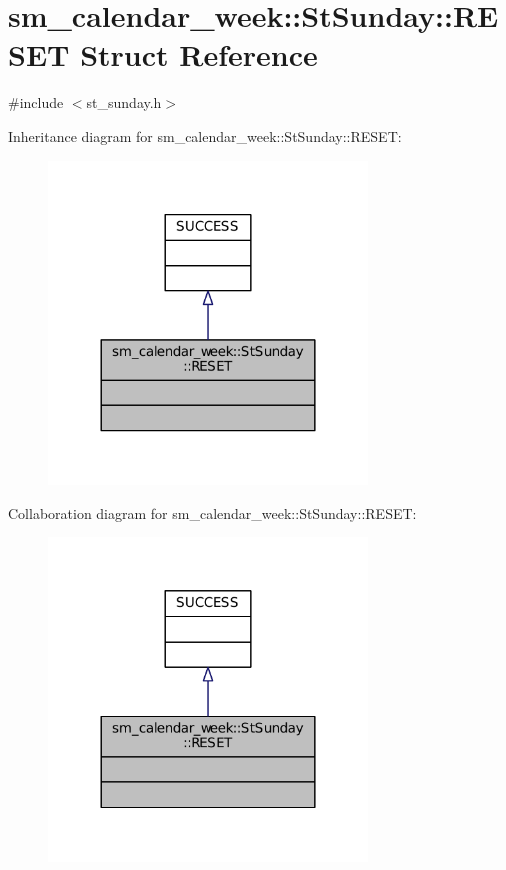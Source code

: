 \hypertarget{structsm__calendar__week_1_1StSunday_1_1RESET}{}\section{sm\+\_\+calendar\+\_\+week\+:\+:St\+Sunday\+:\+:R\+E\+S\+ET Struct Reference}
\label{structsm__calendar__week_1_1StSunday_1_1RESET}


{\ttfamily \#include $<$st\+\_\+sunday.\+h$>$}



Inheritance diagram for sm\+\_\+calendar\+\_\+week\+:\+:St\+Sunday\+:\+:R\+E\+S\+ET\+:
\nopagebreak
\begin{figure}[H]
\begin{center}
\leavevmode
\includegraphics[width=240pt]{structsm__calendar__week_1_1StSunday_1_1RESET__inherit__graph}
\end{center}
\end{figure}


Collaboration diagram for sm\+\_\+calendar\+\_\+week\+:\+:St\+Sunday\+:\+:R\+E\+S\+ET\+:
\nopagebreak
\begin{figure}[H]
\begin{center}
\leavevmode
\includegraphics[width=240pt]{structsm__calendar__week_1_1StSunday_1_1RESET__coll__graph}
\end{center}
\end{figure}


